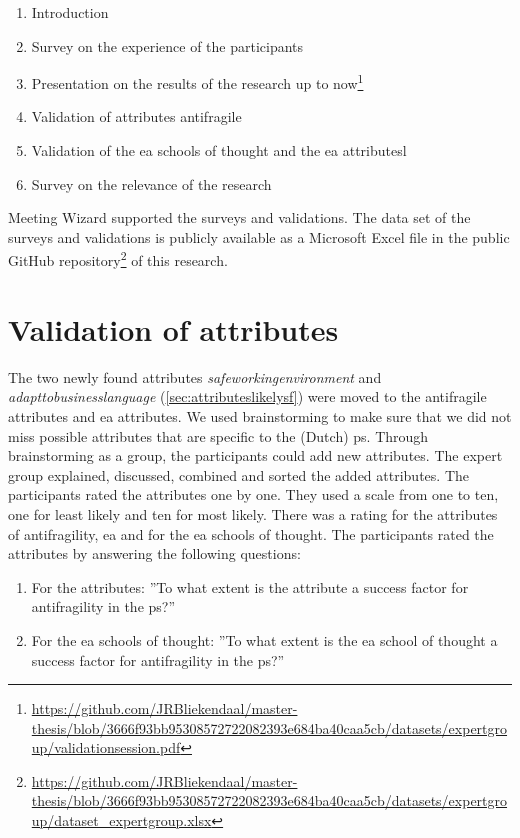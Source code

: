 \begin{enumerate}
	\item{Introduction}
	\item{Survey on the experience of the participants}
	\item{Presentation on the results of the research up to now\footnote{\url{https://github.com/JRBliekendaal/master-thesis/blob/3666f93bb95308572722082393e684ba40caa5cb/datasets/expertgroup/validationsession.pdf}}}
	\item{Validation of \glspl{attribute} \gls{antifragile}}
	\item{Validation of the \acrlong{ea} schools of thought and the \acrlong{ea} \glspl{attribute}l}
	\item{Survey on the relevance of the research}
\end{enumerate}
Meeting Wizard supported the surveys and validations. The data set of the surveys and validations is publicly available as a Microsoft Excel file in the public GitHub repository\footnote{\url{https://github.com/JRBliekendaal/master-thesis/blob/3666f93bb95308572722082393e684ba40caa5cb/datasets/expertgroup/dataset_expertgroup.xlsx}} of this research.
\section{Validation of attributes}
\label{sec:validationofattributes}
The two newly found attributes \textit{\gls{safeworkingenvironment}} and \textit{\gls{adapttobusinesslanguage}} (\cref{sec:attributeslikelysf}) were moved to the \gls{antifragile} \glspl{attribute} and \acrlong{ea} \glspl{attribute}. We used brainstorming to make sure that we did not miss possible \glspl{attribute} that are specific to the (Dutch) \gls{ps}. Through brainstorming as a group, the participants could add new \glspl{attribute}. The expert group explained, discussed, combined and sorted the added \glspl{attribute}. The participants rated the \glspl{attribute} one by one. They used a scale from one to ten, one for least likely and ten for most likely. There was a rating for the \glspl{attribute} of \gls{antifragility}, \acrlong{ea} and for the \acrlong{ea} schools of thought. The participants rated the \glspl{attribute} by answering the following questions:
\begin{enumerate}
	\item{For the \glspl{attribute}: ''To what extent is the \gls{attribute} a success factor for \gls{antifragility} in the \gls{ps}?''}
	\item{For the \acrlong{ea} schools of thought: ''To what extent is the \acrlong{ea} school of thought a success factor for \gls{antifragility} in the \gls{ps}?''}
\end{enumerate}

